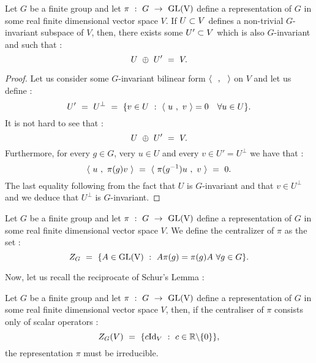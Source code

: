 \begin{theorem}
	Let $G$ be a finite group and let $\pi \text{ }:\text{ } G\text{ }\rightarrow\text{ }\mbox{GL(V)}$ define a representation of $G$ in some real finite dimensional vector space $V$. If $U\subset V$ defines a non-trivial $G$-invariant subspace of $V$, then, there exists some $U'\subset V$ which is also $G$-invariant and such that :
	\begin{equation}
	U\text{ } \oplus \text{ } U'\text{ }=\text{ } V.
	\end{equation}
\end{theorem}
\begin{proof}
	Let us consider some $G$-invariant bilinear form $\langle\text{ } \text{ },\text{ }\text{ }\rangle$ on $V$ and let us define :
	\begin{equation}
	U'\text{ }=\text{ } U^\perp\text{ }=\text{ }\{v\in U\text{ } :\text{ } \langle\text{ } u\text{ },\text{ } v\text{ }\rangle=0\quad \forall u\in U\}.
	\end{equation}
	It is not hard to see that :
	\begin{equation}
	U\text{ } \oplus \text{ } U'\text{ }=\text{ } V.
	\end{equation}
	Furthermore, for every $g\in G$, very $u\in U$ and every $v\in U'=U^\perp$ we have that :
	\begin{equation}
	\langle\text{ } u\text{ },\text{ }\pi(g)v\text{ }\rangle\text{ }=\text{ } \langle\text{ } \pi(g^{-1})u\text{ },\text{ } v\text{ }\rangle\text{ }=\text{ } 0.
	\end{equation}
	The last equality following from the fact that $U$ is $G$-invariant and that $v\in U^\perp$ and we deduce that $U^\perp$ is $G$-invariant.
\end{proof}
\begin{definition}
	Let $G$ be a finite group and let $\pi \text{ }:\text{ } G\text{ }\rightarrow\text{ }\mbox{GL(V)}$ define a representation of $G$ in some real finite dimensional vector space $V$. We define the centralizer of $\pi$ as the set :
	\begin{equation}
	Z_G\text{ }=\text{ } \{A\in \mbox{GL(V)}\text{ } :\text{ } A\pi(g)=\pi(g)A\text{ }\forall g\in G\}.
	\end{equation}
\end{definition}
Now, let us recall the reciprocate of Schur's Lemma :
\begin{lemma}\label{si le centralisateur n'est fait que d'application scalaire, alors V est irreductible}
	Let $G$ be a finite group and let $\pi \text{ }:\text{ } G\text{ }\rightarrow\text{ }\mbox{GL(V)}$ define a representation of $G$ in some real finite dimensional vector space $V$, then, if the centraliser of $\pi$ consists only of scalar operators :
	\begin{equation}
	Z_G(V)\text{ }=\text{ } \{c\mbox{Id}_V\text{ } :\text{ } c\in \mathbb R\backslash\{0\}\},
	\end{equation}
	the representation $\pi$ must be irreducible.
\end{lemma}
